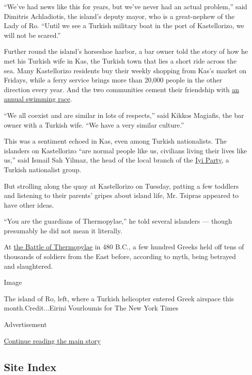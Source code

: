 ``We've had news like this for years, but we've never had an actual
problem,'' said Dimitris Achladiotis, the island's deputy mayor, who is
a great-nephew of the Lady of Ro. ``Until we see a Turkish military boat
in the port of Kastellorizo, we will not be scared.''

Further round the island's horseshoe harbor, a bar owner told the story
of how he met his Turkish wife in Kas, the Turkish town that lies a
short ride across the sea. Many Kastellorizo residents buy their weekly
shopping from Kas's market on Fridays, while a ferry service brings more
than 20,000 people in the other direction every year. And the two
communities cement their friendship with
\href{http://www.bougainville-turkey.com/megisti-kas/}{an annual
swimming race}.

``We all coexist and are similar in lots of respects,'' said Kikkos
Magiafis, the bar owner with a Turkish wife. ``We have a very similar
culture.''

This was a sentiment echoed in Kas, even among Turkish nationalists. The
islanders on Kastellorizo ``are normal people like us, civilians living
their lives like us,'' said Ismail Sah Yilmaz, the head of the local
branch of the
\href{https://www.nytimes3xbfgragh.onion/2018/01/05/world/europe/turkey-aksener-erdogan.html}{Iyi
Party}, a Turkish nationalist group.

But strolling along the quay at Kastellorizo on Tuesday, patting a few
toddlers and listening to their parents' gripes about island life, Mr.
Tsipras appeared to have other ideas.

``You are the guardians of Thermopylae,'' he told several islanders ---
though presumably he did not mean it literally.

At
\href{https://www.britannica.com/event/Battle-of-Thermopylae-Greek-history-480-BC}{the
Battle of Thermopylae} in 480 B.C., a few hundred Greeks held off tens
of thousands of soldiers from the East before, according to myth, being
betrayed and slaughtered.

Image

The island of Ro, left, where a Turkish helicopter entered Greek
airspace this month.Credit...Eirini Vourloumis for The New York Times

Advertisement

\protect\hyperlink{after-bottom}{Continue reading the main story}

\hypertarget{site-index}{%
\subsection{Site Index}\label{site-index}}

